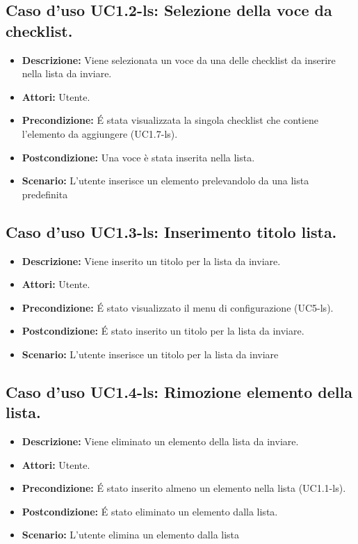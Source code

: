 \subsection{Caso d'uso UC1.2-ls: Selezione della voce da checklist.}
\begin{itemize}
\item[]\textbf{Descrizione:} Viene selezionata un voce da una delle checklist da inserire nella lista da inviare.
\item[]\textbf{Attori:} Utente. 
\item[]\textbf{Precondizione:} \'E stata visualizzata la singola checklist che contiene l'elemento da aggiungere (UC1.7-ls). 
\item[]\textbf{Postcondizione:} Una voce è stata inserita nella lista. 
\item[]\textbf{Scenario:}
L'utente inserisce un elemento prelevandolo da una lista predefinita 
\end{itemize}

\subsection{Caso d'uso UC1.3-ls: Inserimento titolo lista.}
\begin{itemize}
\item[]\textbf{Descrizione:} Viene inserito un titolo per la lista da inviare.
\item[]\textbf{Attori:} Utente. 
\item[]\textbf{Precondizione:} \'E stato visualizzato il menu di configurazione (UC5-ls). 
\item[]\textbf{Postcondizione:} \'E stato inserito un titolo per la lista da inviare. 
\item[]\textbf{Scenario:}
L'utente inserisce un titolo per la lista da inviare 
\end{itemize}

\subsection{Caso d'uso UC1.4-ls: Rimozione elemento della lista.}
\begin{itemize}
\item[]\textbf{Descrizione:} Viene eliminato un elemento della lista da inviare.
\item[]\textbf{Attori:} Utente. 
\item[]\textbf{Precondizione:} \'E stato inserito almeno un elemento nella lista (UC1.1-ls). 
\item[]\textbf{Postcondizione:} \'E stato eliminato un elemento dalla lista. 
\item[]\textbf{Scenario:}
L'utente elimina un elemento dalla lista 
\end{itemize}

